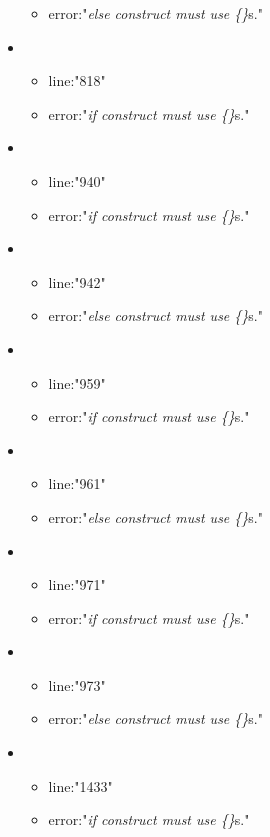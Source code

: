 \begin{itemize}
\begin{itemize}
		\item error:"\emph{else construct must use \{\}}s." 
	\end{itemize}
	\item 
	\begin{itemize} 
		\item line:"818" 
		\item error:"\emph{if construct must use \{\}}s." 
	\end{itemize}
	\item 
	\begin{itemize} 
		\item line:"940" 
		\item error:"\emph{if construct must use \{\}}s." 
	\end{itemize}
	\item 
	\begin{itemize} 
		\item line:"942" 
		\item error:"\emph{else construct must use \{\}}s." 
	\end{itemize}
	\item 
	\begin{itemize} 
		\item line:"959" 
		\item error:"\emph{if construct must use \{\}}s." 
	\end{itemize}
	\item 
	\begin{itemize} 
		\item line:"961" 
		\item error:"\emph{else construct must use \{\}}s." 
	\end{itemize}
	\item 
	\begin{itemize} 
		\item line:"971" 
		\item error:"\emph{if construct must use \{\}}s." 
	\end{itemize}
	\item 
	\begin{itemize} 
		\item line:"973" 
		\item error:"\emph{else construct must use \{\}}s." 
	\end{itemize}
	\item 
	\begin{itemize} 
		\item line:"1433" 
		\item error:"\emph{if construct must use \{\}}s." 

\end{itemize}
\end{itemize}
